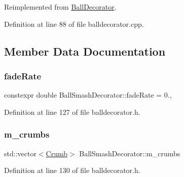 Reimplemented from \mbox{\hyperlink{class_ball_decorator_af8205f8033b2490ecd3365c24ff5cdeb}{Ball\+Decorator}}.



Definition at line 88 of file balldecorator.\+cpp.



\subsection{Member Data Documentation}
\mbox{\label{class_ball_smash_decorator_aeef9438a9102847ca841bc657605e88b}} 
\subsubsection{\texorpdfstring{fade\+Rate}{fadeRate}}
{\footnotesize\ttfamily constexpr double Ball\+Smash\+Decorator\+::fade\+Rate = 0.\hspace{0.3cm}{\ttfamily [static]}, {\ttfamily [protected]}}



Definition at line 127 of file balldecorator.\+h.

\mbox{\label{class_ball_smash_decorator_af9860ac78866ac55c8548b7fd8581610}} 
\subsubsection{\texorpdfstring{m\+\_\+crumbs}{m\_crumbs}}
{\footnotesize\ttfamily std\+::vector$<$\mbox{\hyperlink{struct_ball_smash_decorator_1_1_crumb}{Crumb}}$>$ Ball\+Smash\+Decorator\+::m\+\_\+crumbs\hspace{0.3cm}{\ttfamily [protected]}}



Definition at line 130 of file balldecorator.\+h.

\mbox{\label{class_ball_smash_decorator_a947a58aafc3f976931a532974d89abe0}} 
